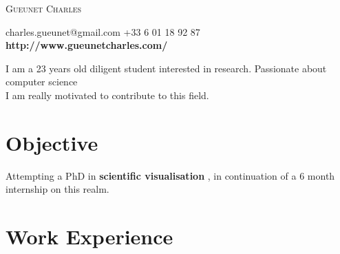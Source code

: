 \documentclass[a4paper, oneside, final]{scrartcl} %
\begin{document}
\begin{center} %


{\fontsize{36}{36}\selectfont\scshape 
Gueunet Charles} %

{\Large\Letter} charles.gueunet@gmail.com \hspace{0.2cm} {\Large\Telefon} +33 6 01 18 92 87 \\
\textbf{http://www.gueunetcharles.com/} 


\vspace{0.3cm} %


\begin{flushleft}
  I am a 23 years old diligent student interested in research. Passionate about computer science \\
  I am really motivated to contribute to this field.
\end{flushleft}


\section{Objective}

Attempting a PhD in \textbf{scientific visualisation} , in continuation of a 6 month internship on this realm.


\section{Work Experience}


\end{center}
\end{document}
